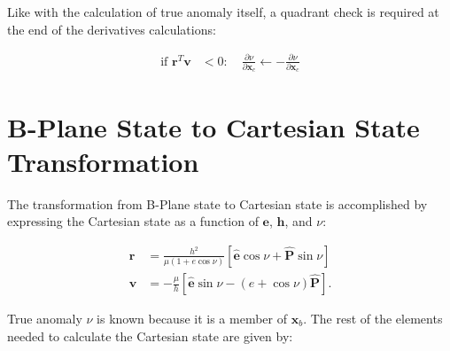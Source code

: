 \documentclass[]{article}
\newcommand{\vb}[1]{\bm{#1}} %
\newcommand{\vbh}[1]{\hat{\bm{#1}}} %
\newcommand{\pd}[2]{\frac{\partial #1}{\partial #2}} %
\newcommand{\xc}[0]{\vb{x}_c}
\begin{document}
Like with the calculation of true anomaly itself, a quadrant check is required at the end of the derivatives calculations:

\begin{align}
	\text{if } \vb{r}^T \vb{v} &< 0: \quad \pd{\nu}{\xc} \leftarrow - \pd{\nu}{\xc}
\end{align}

\section{B-Plane State to Cartesian State Transformation}
\label{sec:bplane2cartesian}

The transformation from B-Plane state to Cartesian state is accomplished by expressing the Cartesian state as a function of $\vb{e}$, $\vb{h}$, and $\nu$:

\begin{align}
	\vb{r} &= \frac{h^2}{\mu \left( 1 + e \cos{\nu} \right)} \left[ \vbh{e} \cos{\nu} + \vbh{P} \sin{\nu} \right] \\
	\vb{v} &= - \frac{\mu}{h} \left[ \vbh{e} \sin{\nu} - \left( e + \cos{\nu} \right) \vbh{P} \right].
\end{align}

\noindent True anomaly $\nu$ is known because it is a member of $\vb{x}_b$. The rest of the elements needed to calculate the Cartesian state are given by:
\end{document}
